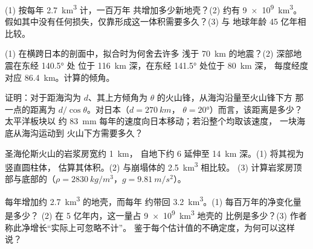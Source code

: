 \begin{exercise}[$\star\star$]\label{exo:g12:subduction-magmatism:10}
(1) 按每年 \qty{2.7}{km^3} 计，一百万年
共增加多少新地壳？(2) 约有 \qty{9e9}{km^3}。
假如其中没有任何损失，仅靠形成这一体积需要多久？(3) 与
地球年龄 45 亿年相比较。
\end{exercise}

\begin{exercise}[$\star\star$]\label{exo:g12:subduction-magmatism:11}
(1) 在横跨日本的剖面中，拟合时为何舍去许多
浅于 \qty{70}{km} 的地震？(2) 深部地震在东经 \ang{140.5} 处
位于 \qty{116}{km} 深，在东经 \ang{141.5} 处位于 \qty{80}{km} 深，
每度经度对应 \qty{86.4}{km}。计算的倾角。
\end{exercise}

\begin{exercise}[$\star\star\star$]\label{exo:g12:subduction-magmatism:12}
证明：对于距海沟为 $d$、其上方倾角为
$\theta$ 的火山锋，从海沟沿量至火山锋下方
那一点的距离为 $d/\cos\theta$。对日本（$d = \qty{270}{km}$，
$\theta = \ang{20}$）而言，该距离是多少？太平洋板块以
约 \qty{83}{mm} 每年的速度向日本移动；若沿整个均取该速度，
一块海底从海沟运动到
火山下方需要多久？
\end{exercise}

\begin{exercise}[$\star\star\star$]\label{exo:g12:subduction-magmatism:13}
圣海伦斯火山的岩浆房宽约 \qty{1}{km}，
自地下约 6 延伸至 \qty{14}{km} 深。(1) 将其视为竖直圆柱体，
估算其体积。(2) 与崩塌体的 \qty{2.5}{km^3} 相比较。
(3) 计算岩浆房顶部与底部的（$\rho =
\qty{2830}{kg/m^3}$，$g = \qty{9.81}{m/s^2}$）。
\end{exercise}

\begin{exercise}[$\star\star\star$]\label{exo:g12:subduction-magmatism:14}
每年增加约 \qty{2.7}{km^3} 的地壳，而每年
约带回 \qty{3.2}{km^3}。(1) 每百万年的净变化量是多少？
(2) 在 5 亿年内，这一量占 \qty{9e9}{km^3} 地壳的
比例是多少？(3) 作者称此净增长“实际上可忽略不计”。
鉴于每个估计值的不确定度，为何可以这样说？
\end{exercise}

